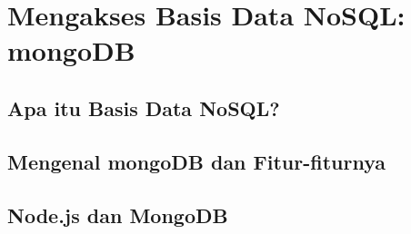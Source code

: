 \chapter{Mengakses Basis Data NoSQL: mongoDB}

\section{Apa itu Basis Data NoSQL?}

\section{Mengenal mongoDB dan Fitur-fiturnya}

\section{Node.js dan MongoDB}

